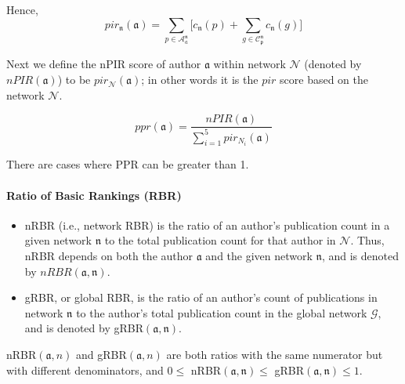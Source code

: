 \documentclass[12pt]{amsart}
\begin{document}
Hence, 
$$ pir_{\mathfrak{n}}(\mathfrak{a}) =  \sum_{p\in \mathcal{A}_a^{\mathfrak{n}} } \big[c_{\mathfrak{{\mathfrak{n}}}}(p) + \sum_{g\in \mathcal{C}_\mathfrak{p}^{\mathfrak{n}}}  c_{\mathfrak{{\mathfrak{n}}}}(g)\big] $$

Next we define the nPIR score  of author $\mathfrak{a}$ within network $\mathcal{N}$ (denoted by $nPIR\mathfrak{(a)}$) to  be  $pir_{\mathcal{N}}(\mathfrak{a})$; in other words
it is the $pir$ score based on the network $\mathcal{N}$.  

$$ppr(\mathfrak{a})= \dfrac{ nPIR({\mathfrak{a}})} {\sum_{i=1}^{5} pir_{N_i}(\mathfrak{a})} $$

There are cases where PPR can be greater than 1.

\vspace{0.05 in}
\paragraph{\textbf {Ratio of Basic Rankings (RBR)}}
\begin{itemize}
\item nRBR (i.e., network RBR) is the ratio of an author's publication count in a given network $\mathfrak{n}$ to the total publication count for that author  in $\mathcal{N}$.
 Thus, nRBR depends on both the author $\mathfrak{a}$ and the given network $\mathfrak{n}$, and is denoted by $nRBR(\mathfrak{a},\mathfrak{n})$.
\item gRBR, or global RBR, is the ratio of an author's count of publications in network $\mathfrak{n}$ to the author's total publication count in the global network $\mathcal{G}$,
and is denoted by gRBR$(\mathfrak{a},\mathfrak{n})$. 
\end{itemize}
\noindent
nRBR$(\mathfrak{a},n)$ and gRBR$(\mathfrak{a},n)$ are both ratios with the same numerator but with different denominators, and  
$0 \leq$ nRBR$(\mathfrak{a},\mathfrak{n}) \leq$ gRBR$(\mathfrak{a},\mathfrak{n}) \leq 1$.

\clearpage
\end{document}
